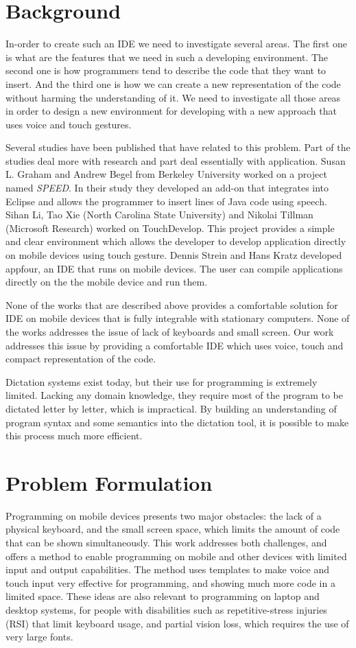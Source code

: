 \section{Background}
In-order to create such an IDE we need to investigate several areas. The first one is what are the features that we need in such a developing environment. The second one is how programmers tend to describe the code that they want to insert. And the third one is how we can create a new representation of the code without harming the understanding of it. We need to investigate all those areas in order to design a new environment for developing with a new approach that uses voice and touch gestures.

Several studies have been published that have related to this problem. Part of the studies deal more with research and part deal essentially with application. Susan L. Graham and Andrew Begel from Berkeley University worked on a project named \textit{SPEED}. In their study they developed an add-on that integrates into Eclipse and allows the programmer to insert lines of Java code using speech. Sihan Li, Tao Xie (North Carolina State University) and Nikolai Tillman (Microsoft Research) worked on TouchDevelop. This project provides a simple and clear environment which allows the developer to develop application directly on mobile devices using touch gesture. Dennis Strein and Hans Kratz developed appfour, an IDE that runs on mobile devices. The user can compile applications directly on the the mobile device and run them.

None of the works that are described above provides a comfortable solution for IDE on mobile devices that is fully integrable with stationary computers. None of the works addresses the issue of lack of keyboards and small screen. 	Our work addresses this issue by providing a comfortable IDE which uses voice, touch and compact representation of the code.

Dictation systems exist today, but their use for programming is extremely limited. Lacking any domain knowledge, they require most of the program to be dictated letter by letter, which is impractical. By building an understanding of program syntax and some semantics into the dictation tool, it is possible to make this process much more efficient.
\section{Problem Formulation}
Programming on mobile devices presents two major obstacles: the lack of a physical keyboard, and the small screen space, which limits the amount of code that can be shown simultaneously. This work addresses both challenges, and offers a method to enable programming on mobile and other devices with limited input and output capabilities. The method uses templates to make voice and touch input very effective for programming, and showing much more code in a limited space. These ideas are also relevant to programming on laptop and desktop systems, for people with disabilities such as repetitive-stress injuries (RSI) that limit keyboard usage, and partial vision loss, which requires the use of very large fonts. 

